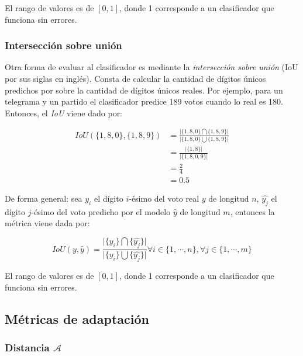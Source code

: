 \noindent
El rango de valores es de $[0, 1]$, donde 1 corresponde a un clasificador que funciona sin errores.

\subsubsection{Intersección sobre unión}

Otra forma de evaluar al clasificador es mediante la {\it intersección sobre unión} (IoU por sus siglas en inglés).
Consta de calcular la cantidad de dígitos únicos predichos por sobre la cantidad de dígitos únicos reales. Por ejemplo,
para un telegrama y un partido el clasificador predice 189 votos cuando lo real es 180. Entonces, el {\it IoU} viene
dado por:

\begin{align}
    IoU(\{1, 8, 0\}, \{1, 8, 9\}) & = \frac{\lvert\{1, 8, 0\} \bigcap \{1, 8, 9\}\rvert}{\lvert\{1, 8, 0\} \bigcup \{1, 8, 9\}\rvert} \nonumber \\
                                  & = \frac{\lvert\{1, 8\}\rvert}{\lvert\{1, 8, 0, 9\}\rvert}                                         \nonumber \\
                                  & = \frac{2}{4}                                                                     \nonumber                 \\
                                  & = 0.5
\end{align}

\noindent
De forma general: sea $y_{i}$ el dígito $i$-ésimo del voto real $y$ de longitud $n$, $\hat{y_{j}}$ el dígito $j$-ésimo
del voto predicho por el modelo $\hat{y}$ de longitud $m$, entonces la métrica viene dada por:

\begin{equation}
    IoU(y, \hat{y}) = \frac{\lvert \{y_{i}\} \bigcap \{\hat{y_{j}}\}\rvert}{\lvert \{y_{i}\} \bigcup \{\hat{y_{j}}\}\rvert} \forall i \in \{1, \cdots, n\}, \forall j \in \{1, \cdots, m\}
\end{equation}

El rango de valores es de $[0, 1]$, donde 1 corresponde a un clasificador que funciona sin errores.

\subsection{Métricas de adaptación}
\subsubsection{Distancia $\mathcal{A}$}

